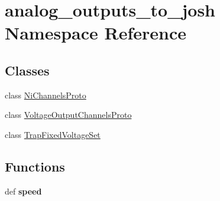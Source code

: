 \hypertarget{namespaceanalog__outputs__to__josh}{\section{analog\-\_\-outputs\-\_\-to\-\_\-josh Namespace Reference}
\label{namespaceanalog__outputs__to__josh}
}
\subsection*{Classes}
\begin{DoxyCompactItemize}
\item 
class \hyperlink{classanalog__outputs__to__josh_1_1_ni_channels_proto}{Ni\-Channels\-Proto}
\item 
class \hyperlink{classanalog__outputs__to__josh_1_1_voltage_output_channels_proto}{Voltage\-Output\-Channels\-Proto}
\item 
class \hyperlink{classanalog__outputs__to__josh_1_1_trap_fixed_voltage_set}{Trap\-Fixed\-Voltage\-Set}
\end{DoxyCompactItemize}
\subsection*{Functions}
\begin{DoxyCompactItemize}
\item 
\hypertarget{namespaceanalog__outputs__to__josh_a541f5b01acf40e869979a9803641a610}{def {\bfseries speed}}\label{namespaceanalog__outputs__to__josh_a541f5b01acf40e869979a9803641a610}

\end{DoxyCompactItemize}

